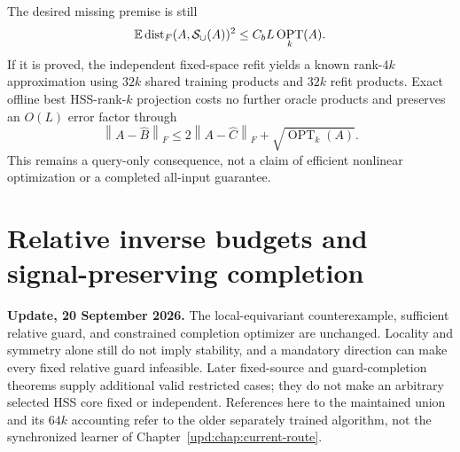 \documentclass[11pt,oneside,openany,a4paper]{book}
\numberwithin{equation}{chapter}
\theoremstyle{definition}
\theoremstyle{remark}
\newcommand{\R}{\mathbb R}\newcommand{\E}{\mathbb E}\newcommand{\Prb}{\mathbb P}\newcommand{\PP}{\mathbb P}
\newcommand{\F}[1]{\left\lVert#1\right\rVert_F}
\newcommand{\op}[1]{\left\lVert#1\right\rVert_{\rm op}}
\DeclareMathOperator{\tr}{tr}\DeclareMathOperator{\rank}{rank}
\DeclareMathOperator{\diag}{blockdiag}\DeclareMathOperator{\range}{range}
\DeclareMathOperator{\ran}{range}\DeclareMathOperator{\OPT}{OPT}
\begin{document}
The desired missing premise is still
\[
 \E\dist_F(A,\mathcal S_\cup(A))^2\le C_bL\OPT_k(A).
\]
If it is proved, the independent fixed-space refit yields a known rank-$4k$ approximation using $32k$ shared training products and $32k$ refit products. Exact offline best HSS-rank-$k$ projection costs no further oracle products and preserves an $O(L)$ error factor through
\[
 \F{A-\widehat B}\le2\F{A-\widehat C}+\sqrt{\OPT_k(A)}.
\]
This remains a query-only consequence, not a claim of efficient nonlinear optimization or a completed all-input guarantee.

\endgroup

\begingroup
\let\E\relax
\newcommand{\E}{\mathbb E}
\let\R\relax
\newcommand{\R}{\mathbb R}
\let\Id\relax
\newcommand{\Id}{\mathrm I}
\let\F\relax
\newcommand{\F}[1]{\lVert #1\rVert_F}
\let\op\relax
\newcommand{\op}[1]{\lVert #1\rVert_{\rm op}}
\let\tr\relax
\newcommand{\tr}{\operatorname{tr}}
\let\ran\relax
\newcommand{\ran}{\operatorname{range}}
\let\rank\relax
\newcommand{\rank}{\operatorname{rank}}
\let\diag\relax
\newcommand{\diag}{\operatorname{blockdiag}}
\let\dist\relax
\newcommand{\dist}{\operatorname{dist}}
\let\OPT\relax
\newcommand{\OPT}{\operatorname{OPT}}
\chapter{Relative inverse budgets and signal-preserving completion}\label{ch:budget}
\begin{scopebox}
\textbf{Update, 20 September 2026.} The local-equivariant counterexample, sufficient relative guard, and constrained completion optimizer are unchanged. Locality and symmetry alone still do not imply stability, and a mandatory direction can make every fixed relative guard infeasible. Later fixed-source and guard-completion theorems supply additional valid restricted cases; they do not make an arbitrary selected HSS core fixed or independent. References here to the maintained union and its $64k$ accounting refer to the older separately trained algorithm, not the synchronized learner of Chapter~\ref{upd:chap:current-route}.
\end{scopebox}
\end{document}
